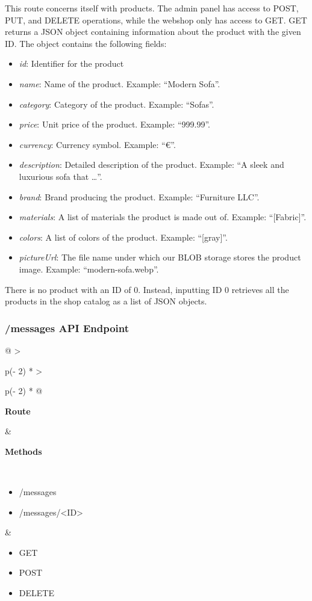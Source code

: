 This route concerns itself with products. The admin panel has access to POST, PUT, and DELETE operations, 
while the webshop only has access to GET. GET returns a JSON object containing information about
the product with the given ID.
The object contains the following fields:
\begin{itemize}
    \item \textit{id}: Identifier for the product
    \item \textit{name}: Name of the product. Example: “Modern Sofa”.
    \item \textit{category}: Category of the product. Example: “Sofas”.
    \item \textit{price}: Unit price of the product. Example: “999.99”.
    \item \textit{currency}: Currency symbol. Example: “€”.
    \item \textit{description}: Detailed description of the product. Example: “A sleek and luxurious sofa that \dots”.
    \item \textit{brand}: Brand producing the product. Example: “Furniture LLC”.
    \item \textit{materials}: A list of materials the product is made out of. Example: “[Fabric]”.
    \item \textit{colors}: A list of colors of the product. Example: “[gray]”.
    \item \textit{pictureUrl}: The file name under which our BLOB storage stores the product image. Example: “modern-sofa.webp”.
\end{itemize}
There is no product with an ID of 0. Instead, inputting ID 0 retrieves all the products in the shop catalog
as a list of JSON objects.

\subsubsection{/messages API Endpoint}

\begin{longtable}[]{@{}
    >{\raggedright\arraybackslash}p{(\columnwidth - 2\tabcolsep) * }
    >{\raggedright\arraybackslash}p{(\columnwidth - 2\tabcolsep) * }@{}}
\toprule
\begin{minipage}[b]{\linewidth}\raggedright
\textbf{Route}
\end{minipage} & \begin{minipage}[b]{\linewidth}\raggedright
\textbf{Methods}
\end{minipage} \\
\midrule
\endhead
\begin{itemize}
    \item /messages
    \item /messages/<ID>
\end{itemize} &
\begin{itemize}
    \item GET
    \item POST
    \item DELETE
\end{itemize} \\
\bottomrule
\end{longtable}

